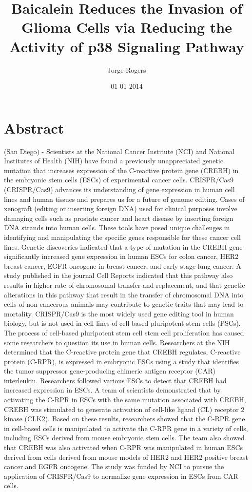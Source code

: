 \documentclass{article}%
\title{Baicalein Reduces the Invasion of Glioma Cells via Reducing the Activity of p38 Signaling Pathway}%
\author{Jorge Rogers}%
\affil{Zhang Zhongjing College of Chinese Medicine, Nanyang Institute of Technology, China}%
\date{01{-}01{-}2014}%
\begin{document}
%
\normalsize%
\maketitle%
\section{Abstract}%
\label{sec:Abstract}%
(San Diego) {-} Scientists at the National Cancer Institute (NCI) and National Institutes of Health (NIH) have found a previously unappreciated genetic mutation that increases expression of the C{-}reactive protein gene (CREBH) in the embryonic stem cells (ESCs) of experimental cancer cells. CRISPR/Cas9 (CRISPR/Cas9) advances its understanding of gene expression in human cell lines and human tissues and prepares us for a future of genome editing.\newline%
Cases of xenograft (editing or inserting foreign DNA) used for clinical purposes involve damaging cells such as prostate cancer and heart disease by inserting foreign DNA strands into human cells. These tools have posed unique challenges in identifying and manipulating the specific genes responsible for these cancer cell lines.\newline%
Genetic discoveries indicated that a type of mutation in the CREBH gene significantly increased gene expression in human ESCs for colon cancer, HER2 breast cancer, EGFR oncogene in breast cancer, and early{-}stage lung cancer. A study published in the journal Cell Reports indicated that this pathway also results in higher rate of chromosomal transfer and replacement, and that genetic alterations in this pathway that result in the transfer of chromosomal DNA into cells of non{-}cancerous animals may contribute to genetic traits that may lead to mortality. CRISPR/Cas9 is the most widely used gene editing tool in human biology, but is not used in cell lines of cell{-}based pluripotent stem cells (PSCs). The process of cell{-}based pluripotent stem cell stem cell proliferation has caused some researchers to question its use in human cells.\newline%
Researchers at the NIH determined that the C{-}reactive protein gene that CREBH regulates, C{-}reactive protein (C{-}RPR), is expressed in embryonic ESCs using a study that identifies the tumor suppressor gene{-}producing chimeric antigen receptor (CAR) interleukin. Researchers followed various ESCs to detect that CREBH had increased expression in ESCs. A team of scientists demonstrated that by activating the C{-}RPR in ESCs with the same mutation associated with CREBH, CREBH was stimulated to generate activation of cell{-}like ligand (CL) receptor 2 kinase (CLK2). Based on these results, researchers showed that the C{-}RPR gene in cell{-}based cells is manipulated to activate the C{-}RPR gene in a variety of cells, including ESCs derived from mouse embryonic stem cells. The team also showed that CREBH was also activated when C{-}RPR was manipulated in human ESCs derived from cells derived from mouse models of HER2 and HER2 positive breast cancer and EGFR oncogene.\newline%
The study was funded by NCI to pursue the application of CRISPR/Cas9 to normalize gene expression in ESCs from CAR cells.
\end{document}
